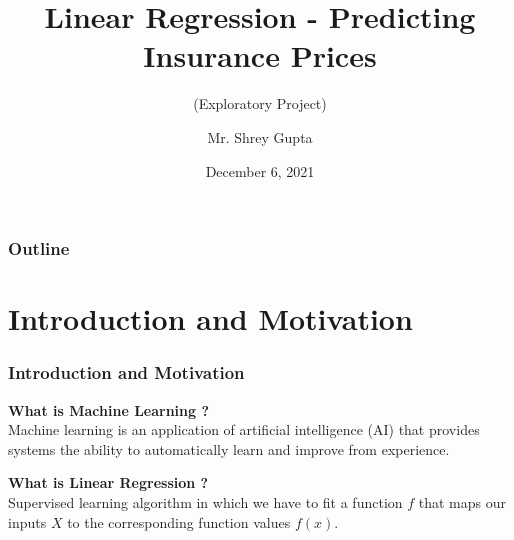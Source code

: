 \documentclass[handout,9pt]{beamer}
\numberwithin{theorem}{section}
\begin{document}
	\title[Linear Regression]{Linear Regression - Predicting Insurance Prices}
	\subtitle{(Exploratory Project)}
	
	
	\author[Shrey Gupta]{\Large Mr. Shrey Gupta}
	
	
	\date{December 6, 2021}
	
	\frame{\titlepage}
	\begin{frame}
		\frametitle{Outline}
	\tableofcontents
	\end{frame}

\section{Introduction and Motivation}

\begin{frame}
\begin{spacing}{1}
\frametitle{Introduction and Motivation}
\begin{definition}
	\textbf{What is Machine Learning ?} \pause\\
	\vspace{0.2cm}
	Machine learning is an application of artificial intelligence (AI) that provides systems the ability to automatically learn and improve from experience.\pause
\end{definition}
\begin{definition}
	\textbf{What is Linear Regression ?} \pause\\
	\vspace{0.2cm}
	Supervised learning algorithm in which we have to fit a function $f$ that maps our inputs $X$ to the corresponding function values $f(x)$.
\end{definition}
\end{spacing}
\end{frame}
\end{document}
